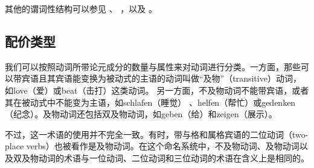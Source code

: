 其他的谓词性结构可以参见 、 ，以及 。

\subsection{配价类型}

我们可以按照动词所带论元成分的数量与属性来对动词进行分类。一方面，那些可以带宾语且其宾语能变换为被动式的主语的动词叫做“及物”（transitive）动词，如love（爱）或beat（击打）这类动词。
另一方面，不及物动词不能带宾语，或者其在被动式中不能变为主语，如schlafen（睡觉） 、helfen（帮忙）或gedenken（纪念）。及物动词还包括双及物动词，如geben（给）和zeigen（展示）。

不过，这一术语的使用并不完全一致。有时，带与格和属格宾语的二位动词（two-place verbs）也被看作是及物动词。在这个命名系统中，不及物动词、及物动词以及双及物动词的术语与一位动词、二位动词和三位动词的术语在含义上是相同的。

